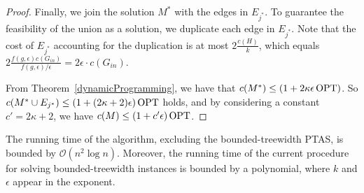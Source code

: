 \begin{proof}
    Finally, we join the solution \(M^\ast\) with the edges in \(E_{j^\ast}\). To guarantee the feasibility of the union as a solution, we duplicate each edge in \(E_{j^\ast}\). Note that the cost of \(E_{j^\ast}\) accounting for the duplication is at most \(2 \frac{c(H)}{k}\), which equals \(2 \frac{f(g, \epsilon) c(G_{in})}{f(g, \epsilon) / \epsilon} = 2 \epsilon \cdot c(G_{in})\).

    From Theorem~\ref{dynamicProgramming}, we have that \(c(M^\ast) \leq (1 + 2 \kappa \epsilon \operatorname{\textrm{OPT}})\). So \(c(M^\ast \cup E_{j^\ast}) \leq (1 + (2 \kappa + 2) \epsilon) \operatorname{\textrm{OPT}}\) holds, and by considering a constant \(c' = 2 \kappa + 2\), we have \(c(M) \leq (1 + c' \epsilon) \operatorname{\textrm{OPT}}\).

\end{proof}

The running time of the algorithm, excluding the bounded-treewidth PTAS, is bounded by \(\mathcal{O}(n^2 \log n)\). Moreover, the running time of the current procedure for solving bounded-treewidth instances is bounded by a polynomial, where \(k\) and \(\epsilon\) appear in the exponent.

